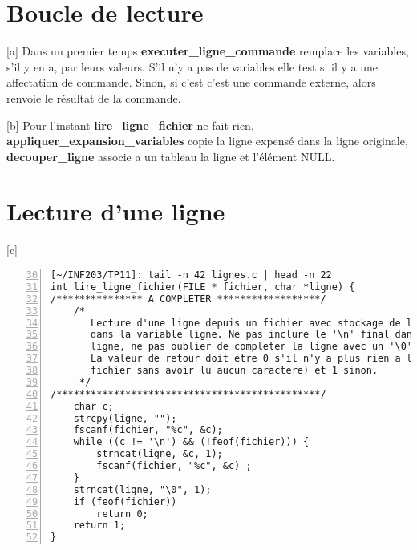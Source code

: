 \documentclass[12pt,a4paper,notitlepage,colorinlistoftodos]{article}
\begin{document}

\section{Boucle de lecture}

[a]
Dans un premier temps \textbf{executer_ligne_commande} remplace les variables, s'il y en a, par leurs valeurs. 
S'il n'y a pas de variables elle test si il y a une affectation de commande. 
Sinon, si c'est c'est une commande externe, alors renvoie le résultat de la commande.


[b]
Pour l'instant \textbf{lire_ligne_fichier} ne fait rien, \textbf{appliquer_expansion_variables} copie la ligne expensé dans la ligne
originale, \textbf{decouper_ligne} associe a un tableau la ligne et l'élément NULL.


\section{Lecture d'une ligne}

[c]
\begin{lstlisting}[numbers=left, firstnumber = 30]
[~/INF203/TP11]: tail -n 42 lignes.c | head -n 22
int lire_ligne_fichier(FILE * fichier, char *ligne) {
/*************** A COMPLETER ******************/
    /*
       Lecture d'une ligne depuis un fichier avec stockage de la ligne lue
       dans la variable ligne. Ne pas inclure le '\n' final dans la variable
       ligne, ne pas oublier de completer la ligne avec un '\0' terminal.
       La valeur de retour doit etre 0 s'il n'y a plus rien a lire (fin de
       fichier sans avoir lu aucun caractere) et 1 sinon.
     */
/**********************************************/
    char c;
    strcpy(ligne, "");
    fscanf(fichier, "%c", &c);
    while ((c != '\n') && (!feof(fichier))) {
        strncat(ligne, &c, 1);
        fscanf(fichier, "%c", &c) ;   
    }
    strncat(ligne, "\0", 1);
    if (feof(fichier))
        return 0;
    return 1;
}
\end{lstlisting}
\end{document}
